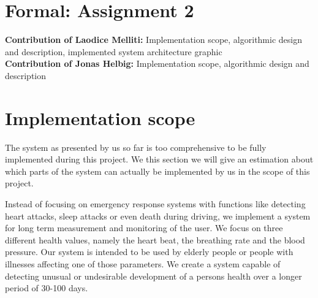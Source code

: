 \section{Formal: Assignment 2}
\textbf{Contribution of Laodice Melliti:} Implementation scope, algorithmic design and description, implemented system architecture graphic\\
\textbf{Contribution of Jonas Helbig:}  Implementation scope, algorithmic design and description\\
\section{Implementation scope}
The system as presented by us so far is too comprehensive to be fully implemented during this project. We this section we will give an estimation about which parts of the system can actually be implemented by us in the scope of this project.

Instead of focusing on emergency response systems with functions like detecting heart attacks, sleep attacks or even death during driving, we implement a system for long term measurement and monitoring of the user.
We focus on three different health values, namely the heart beat, the breathing rate and the blood pressure. Our system is intended to be used by elderly people or people with illnesses affecting one of those parameters. 
We create a system capable of detecting unusual or undesirable development of a persons health over a longer period of 30-100 days.

